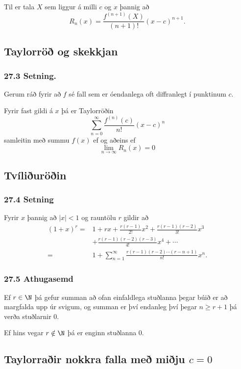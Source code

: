 Til er tala $X$ sem liggur á milli $c$ og $x$
þannig að 
$$
R_n(x)=\frac{f^{(n+1)}(X)}{(n+1)!}(x-c)^{n+1}.
$$



\subsection[t]{Taylorröð og skekkjan}
 \subsubsection{27.3 Setning.}  Gerum ráð fyrir að $f$ sé fall sem er óendanlega
oft diffranlegt í punktinum $c$. 
\pause

Fyrir fast gildi á $x$ þá er Taylorröðin 
$$
\sum_{n=0}^\infty
\frac{f^{(n)}(c)}{n!}(x-c)^n
$$ samleitin með summu $f(x)$ \pause ef og aðeins
ef $$\lim_{n\rightarrow\infty}R_n(x)=0$$



\subsection[t]{Tvíliðuröðin}
 \subsubsection{27.4 Setning}
Fyrir $x$ þannig að $|x|<1$ og rauntölu $r$ gildir að \pause
\begin{align*}
(1+x)^r =& 1+rx+\frac{r(r-1)}{2!}x^2+
\frac{r(r-1)(r-2)}{3!}x^3 \\ 
&+\frac{r(r-1)(r-2)(r-3)}{4!}x^4+\cdots\\
=& 1+ \sum_{n=1}^\infty \frac{r(r-1)(r-2)\cdots(r-n+1)}{n!}x^n.
\end{align*}
\pause
\subsubsection{27.5 Athugasemd}
 Ef $r \in \N$ þá gefur summan að ofan einfaldlega stuðlanna þegar búið er að 
margfalda upp úr svigum, og summan er því endanleg því þegar $n \geq r+1$ þá
verða stuðlarnir 0.
\pause

Ef hins vegar $r\notin \N$ þá er enginn stuðlanna 0.





\subsection[t]{Taylorraðir nokkra falla með miðju $c=0$}
